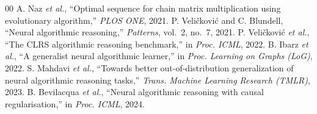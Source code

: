 \documentclass[conference]{IEEEtran}
\begin{document}
\begin{thebibliography}{00}
 A. Naz \emph{et al.}, ``Optimal sequence for chain matrix multiplication using evolutionary algorithm,'' \emph{PLOS ONE}, 2021.
 P. Veli\v{c}kovi\'{c} and C. Blundell, ``Neural algorithmic reasoning,'' \emph{Patterns}, vol.~2, no.~7, 2021.
 P. Veli\v{c}kovi\'{c} \emph{et al.}, ``The CLRS algorithmic reasoning benchmark,'' in \emph{Proc. ICML}, 2022.
 B. Ibarz \emph{et al.}, ``A generalist neural algorithmic learner,'' in \emph{Proc. Learning on Graphs (LoG)}, 2022.
 S. Mahdavi \emph{et al.}, ``Towards better out-of-distribution generalization of neural algorithmic reasoning tasks,'' \emph{Trans. Machine Learning Research (TMLR)}, 2023.
 B. Bevilacqua \emph{et al.}, ``Neural algorithmic reasoning with causal regularisation,'' in \emph{Proc. ICML}, 2024.

\end{thebibliography}
\end{document}
